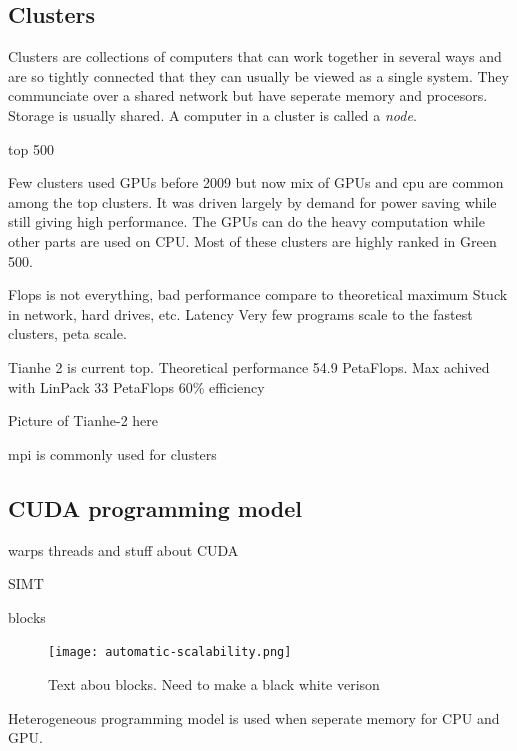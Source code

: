 \documentclass[10pt,a4paper]{report}
\begin{document}
\subsection{Clusters}
Clusters are collections of computers that can work together in several ways and are so tightly connected that they can usually be viewed as a single system. They communciate over a shared network but have seperate memory and procesors. Storage is usually shared. A computer in a cluster is called a \emph{node}. \cite{intro_hpc, kirk2012programming}

top 500\cite{TOP500}

Few clusters used GPUs before 2009 but now mix of GPUs and cpu are common among the top clusters. It was driven largely by demand for power saving while still giving high performance. The GPUs can do the heavy computation while other parts are used on CPU. Most of these clusters are highly ranked in Green 500. \cite{kirk2012programming}

Flops is not everything, bad performance compare to theoretical maximum
Stuck in network, hard drives, etc. Latency
Very few programs scale to the fastest clusters, peta scale.

Tianhe 2 is current top. Theoretical performance 54.9 PetaFlops.\cite{TOP500}
Max achived with LinPack 33 PetaFlops
60\% efficiency

Picture of Tianhe-2 here

mpi is commonly used for clusters\cite{kirk2012programming}

\subsection{CUDA programming model}
warps threads and stuff about CUDA\cite{cuda}

SIMT

blocks

\begin{figure}[h]
    \centering
    \texttt{[image: automatic-scalability.png]}
    \caption{Text abou blocks. Need to make a black white verison}
    \label{fig:blocks_scaling}
\end{figure}

Heterogeneous programming model is used when seperate memory for CPU and GPU.
\end{document}
